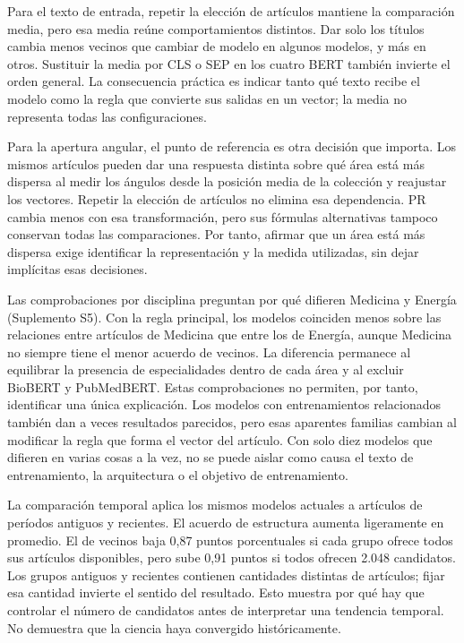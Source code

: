 \documentclass[12pt]{article}
\begin{document}
Para el texto de entrada, repetir la elección de artículos mantiene la comparación media, pero esa media reúne comportamientos distintos. Dar solo los títulos cambia menos vecinos que cambiar de modelo en algunos modelos, y más en otros. Sustituir la media por CLS o SEP en los cuatro BERT también invierte el orden general. La consecuencia práctica es indicar tanto qué texto recibe el modelo como la regla que convierte sus salidas en un vector; la media no representa todas las configuraciones.

Para la apertura angular, el punto de referencia es otra decisión que importa. Los mismos artículos pueden dar una respuesta distinta sobre qué área está más dispersa al medir los ángulos desde la posición media de la colección y reajustar los vectores. Repetir la elección de artículos no elimina esa dependencia. PR cambia menos con esa transformación, pero sus fórmulas alternativas tampoco conservan todas las comparaciones. Por tanto, afirmar que un área está más dispersa exige identificar la representación y la medida utilizadas, sin dejar implícitas esas decisiones.

Las comprobaciones por disciplina preguntan por qué difieren Medicina y Energía (Suplemento S5). Con la regla principal, los modelos coinciden menos sobre las relaciones entre artículos de Medicina que entre los de Energía, aunque Medicina no siempre tiene el menor acuerdo de vecinos. La diferencia permanece al equilibrar la presencia de especialidades dentro de cada área y al excluir BioBERT y PubMedBERT. Estas comprobaciones no permiten, por tanto, identificar una única explicación. Los modelos con entrenamientos relacionados también dan a veces resultados parecidos, pero esas aparentes familias cambian al modificar la regla que forma el vector del artículo. Con solo diez modelos que difieren en varias cosas a la vez, no se puede aislar como causa el texto de entrenamiento, la arquitectura o el objetivo de entrenamiento.

La comparación temporal aplica los mismos modelos actuales a artículos de períodos antiguos y recientes. El acuerdo de estructura aumenta ligeramente en promedio. El de vecinos baja 0,87 puntos porcentuales si cada grupo ofrece todos sus artículos disponibles, pero sube 0,91 puntos si todos ofrecen 2.048 candidatos. Los grupos antiguos y recientes contienen cantidades distintas de artículos; fijar esa cantidad invierte el sentido del resultado. Esto muestra por qué hay que controlar el número de candidatos antes de interpretar una tendencia temporal. No demuestra que la ciencia haya convergido históricamente.
\end{document}

